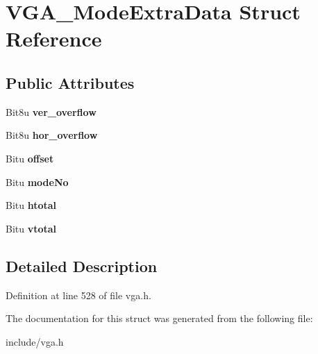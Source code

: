 \hypertarget{structVGA__ModeExtraData}{\section{V\-G\-A\-\_\-\-Mode\-Extra\-Data Struct Reference}
\label{structVGA__ModeExtraData}
}
\subsection*{Public Attributes}
\begin{DoxyCompactItemize}
\item 
\hypertarget{structVGA__ModeExtraData_a020b5a995f7d52935b5e4fb5899fe72d}{Bit8u {\bfseries ver\-\_\-overflow}}\label{structVGA__ModeExtraData_a020b5a995f7d52935b5e4fb5899fe72d}

\item 
\hypertarget{structVGA__ModeExtraData_a60204db357ea608c5f03a8d59c80d3ff}{Bit8u {\bfseries hor\-\_\-overflow}}\label{structVGA__ModeExtraData_a60204db357ea608c5f03a8d59c80d3ff}

\item 
\hypertarget{structVGA__ModeExtraData_a11bba06bf4bcd5cb9aca1442e5d9b368}{Bitu {\bfseries offset}}\label{structVGA__ModeExtraData_a11bba06bf4bcd5cb9aca1442e5d9b368}

\item 
\hypertarget{structVGA__ModeExtraData_a4af1e6bf83f95024c09802255715702a}{Bitu {\bfseries mode\-No}}\label{structVGA__ModeExtraData_a4af1e6bf83f95024c09802255715702a}

\item 
\hypertarget{structVGA__ModeExtraData_a21c6015134a307927a2ab9915c2dfb41}{Bitu {\bfseries htotal}}\label{structVGA__ModeExtraData_a21c6015134a307927a2ab9915c2dfb41}

\item 
\hypertarget{structVGA__ModeExtraData_a9410324359daa0b31e4026d9e70aeae0}{Bitu {\bfseries vtotal}}\label{structVGA__ModeExtraData_a9410324359daa0b31e4026d9e70aeae0}

\end{DoxyCompactItemize}


\subsection{Detailed Description}


Definition at line 528 of file vga.\-h.



The documentation for this struct was generated from the following file\-:\begin{DoxyCompactItemize}
\item 
include/vga.\-h\end{DoxyCompactItemize}
